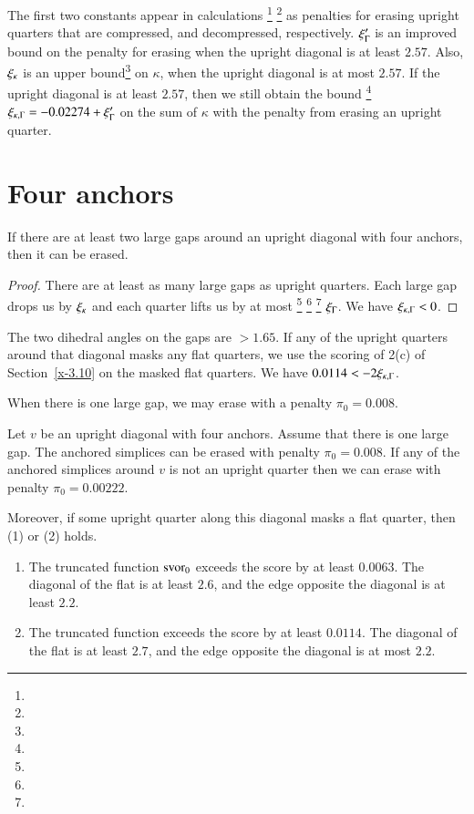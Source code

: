The first two constants appear in calculations%
\footnote{} %
\footnote{} %
as penalties for erasing upright quarters that are compressed, and
decompressed, respectively. $\xi_\Gamma'$ is an improved bound on the
penalty for erasing when the upright diagonal is at least $2.57$.
Also, $\xi_\kappa$ is an upper bound\footnote{} %
 on $\kappa$, when the
upright diagonal is at most $2.57$.  If the upright diagonal is at
least $2.57$, then we still obtain the bound%
\footnote{} %
$\xi_{\kappa,\Gamma} =-0.02274+\xi_\Gamma'$ on the sum of $\kappa$ with the
penalty from erasing an upright quarter.

\section{Four anchors} %

\begin{lemma}
If there are at least two large gaps around an upright diagonal with
four anchors, then it can be erased.
\end{lemma}

\begin{proof}
There are at least as many large gaps as upright quarters. Each large
gap drops us by $\xi_\kappa$ and each quarter lifts us by at most%
\footnote{} %
\footnote{} %
\footnote{} %
$\xi_\Gamma$. We have $\xi_{\kappa,\Gamma}<0$.
\end{proof}


The two dihedral angles on the gaps are $>1.65$.  If any of the upright
quarters around that diagonal
masks any flat quarters, we use the scoring of 2(c) of Section~\ref{x-3.10}
on the masked flat quarters. 
We have
$0.0114< -2\xi_{\kappa,\Gamma}$.

When there is one large gap, we may erase with a penalty $\pi_0=0.008$.

\begin{lemma}
    \label{lemma:0.008}
Let $v$ be an upright diagonal with four anchors.  Assume that there
is one large gap.  The anchored simplices can be erased with penalty
$\pi_0=0.008$. If any of the anchored simplices around $v$ is not an
upright quarter then we can erase with penalty $\pi_0=0.00222$.

Moreover, if 
some upright quarter along this diagonal masks a flat quarter, 
then (1) or (2) holds.
    \begin{enumerate}
    \item The truncated function $\operatorname{svor}_0$ exceeds the score by at least
    $0.0063$. The diagonal of the flat is at least $2.6$, and the edge
    opposite the diagonal is at least $2.2$.
    \item The truncated function exceeds the score by at least
    $0.0114$.  The diagonal of the flat is at least $2.7$, and the edge
    opposite the diagonal is at most $2.2$.
    \end{enumerate}
\end{lemma}

